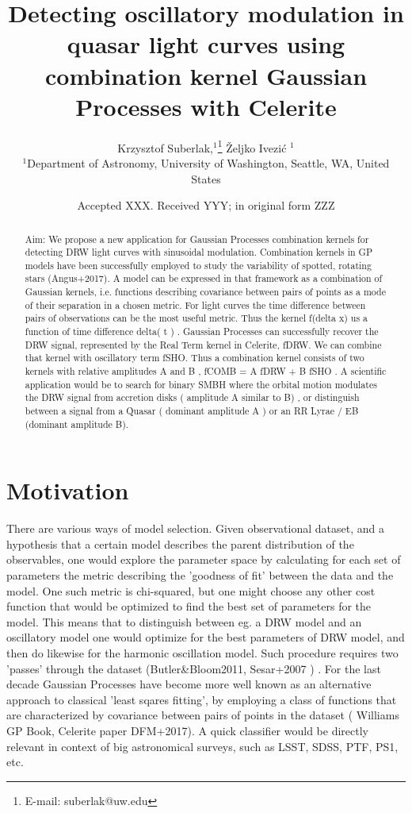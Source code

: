 \documentclass[fleqn,usenatbib]{mnras}  %
\title[DRW kernels]{ Detecting oscillatory modulation in quasar light curves using combination kernel Gaussian Processes with Celerite}
\author[K. Suberlak et al.]{
Krzysztof Suberlak,$^{1}$\thanks{E-mail: suberlak@uw.edu}
\v{Z}eljko Ivezi\'c $^{1}$
\\
$^{1}$Department of Astronomy, University of Washington, Seattle, WA, United States\\
}
\date{Accepted XXX. Received YYY; in original form ZZZ}
\begin{document}
\label{firstpage}
\pagerange{\pageref{firstpage}--\pageref{lastpage}}
\maketitle

\begin{abstract}
 Aim:  We propose a new application for Gaussian Processes combination kernels for detecting DRW light curves with sinusoidal modulation.  Combination kernels in GP models have been successfully employed to study the variability of  spotted, rotating stars (Angus+2017). A model can be expressed in that framework as a combination of Gaussian kernels, i.e. functions describing covariance between pairs of points as a mode of their separation in a chosen metric. For light curves the time difference between pairs of observations can be the most useful metric. Thus the kernel f(delta x)  us a function of time difference delta( t ) . Gaussian Processes can successfully recover the DRW signal, represented by the Real Term kernel in Celerite, fDRW.  We can combine that kernel with  oscillatory term fSHO.  Thus a combination kernel consists of two kernels with relative amplitudes A and B ,  fCOMB = A fDRW + B fSHO . A scientific application would be to search for binary SMBH where the orbital motion modulates the DRW signal from accretion disks ( amplitude A similar to B) ,  or distinguish between a signal from a Quasar ( dominant amplitude A ) or an RR Lyrae / EB (dominant amplitude B).  
\end{abstract}




\section{Motivation}
There are various ways of model selection. Given observational dataset, and a hypothesis that a certain model describes the parent distribution of the observables, one would explore the parameter space by calculating for each set of parameters the metric describing  the 'goodness of fit' between the data and the model.  One such metric is  chi-squared,  but one might choose any other cost function that would be optimized to find the best set of parameters for the model. This means that to distinguish between eg. a DRW model and an oscillatory model one would optimize for the best parameters of DRW model, and then do likewise for the harmonic oscillation model. Such procedure requires two 'passes' through the dataset (Butler\&Bloom2011,  Sesar+2007 ) . For the last decade Gaussian Processes have become more well known as an alternative approach to classical  'least sqares fitting', by employing a class of functions that  are characterized by covariance between pairs of points in the dataset ( Williams GP Book, Celerite paper  DFM+2017).   A quick classifier would be directly relevant in context of big astronomical surveys, such as LSST, SDSS, PTF, PS1, etc. 
\end{document}
